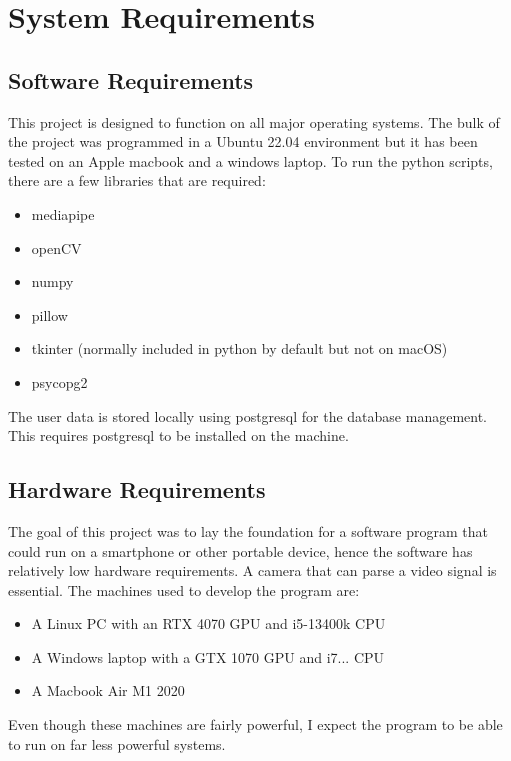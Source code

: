 
\section{System Requirements}
    \subsection{Software Requirements}
        This project is designed to function on all major operating systems. The bulk of the project was programmed in a Ubuntu 22.04 environment but it has been tested on an Apple macbook and a windows laptop. To run the python scripts, there are a few libraries that are required:
        \begin{itemize}
            \item mediapipe
            \item openCV
            \item numpy
            \item pillow
            \item tkinter (normally included in python by default but not on macOS)
            \item psycopg2
        \end{itemize}
        The user data is stored locally using postgresql for the database management. This requires postgresql to be installed on the machine.
    \subsection{Hardware Requirements}
        The goal of this project was to lay the foundation for a software program that could run on a smartphone or other portable device, hence the software has relatively low hardware requirements. A camera that can parse a video signal is essential. The machines used to develop the program are:
        \begin{itemize}
            \item A Linux PC with an RTX 4070 GPU and i5-13400k CPU
            \item A Windows laptop with a GTX 1070 GPU and i7... CPU
            \item A Macbook Air M1 2020
        \end{itemize}
        Even though these machines are fairly powerful, I expect the program to be able to run on far less powerful systems.
    
